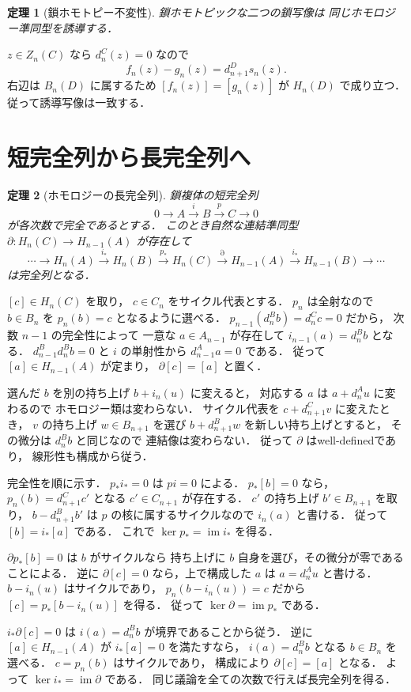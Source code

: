 \documentclass[a5paper,10pt,onecolumn]{jsarticle}
\makeatletter
\theoremstyle{mathnotetheorem}
\newtheorem{theorem}{定理}[section]
\renewcommand{\proofname}{証明}
\renewenvironment{proof}[1][\proofname]{%
  \par\pushQED{\qed}\normalfont\topsep4\p@\@plus2\p@\relax
  \trivlist\item[\hskip\labelsep\bfseries #1]\ignorespaces
}{\popQED\endtrivlist\@endpefalse}
\makeatother
\begin{document}
\begin{theorem}[鎖ホモトピー不変性]\label{thm:chain-homotopy}
鎖ホモトピックな二つの鎖写像は
同じホモロジー準同型を誘導する．
\end{theorem}
\begin{proof}
$z\in Z_n(C)$ なら $d^C_n(z)=0$ なので
\[
 f_n(z)-g_n(z)=d^D_{n+1}s_n(z).
\]
右辺は $B_n(D)$ に属するため
$[f_n(z)]=[g_n(z)]$ が $H_n(D)$ で成り立つ．
従って誘導写像は一致する．
\end{proof}

\section{短完全列から長完全列へ}

\begin{theorem}[ホモロジーの長完全列]
\label{thm:long-exact}
鎖複体の短完全列
\[
 0\longrightarrow A
 \xrightarrow{i}B\xrightarrow{p}C\longrightarrow0
\]
が各次数で完全であるとする．
このとき自然な連結準同型
$\partial:H_n(C)\to H_{n-1}(A)$ が存在して
\[
 \cdots\to H_n(A)\xrightarrow{i_*}H_n(B)
 \xrightarrow{p_*}H_n(C)\xrightarrow{\partial}H_{n-1}(A)
 \xrightarrow{i_*}H_{n-1}(B)\to\cdots
\]
は完全列となる．
\end{theorem}
\begin{proof}
$[c]\in H_n(C)$ を取り，
$c\in C_n$ をサイクル代表とする．
$p_n$ は全射なので $b\in B_n$ を
$p_n(b)=c$ となるように選べる．
$p_{n-1}(d^B_nb)=d^C_nc=0$ だから，
次数 $n-1$ の完全性によって
一意な $a\in A_{n-1}$ が存在して
$i_{n-1}(a)=d^B_nb$ となる．
$d^B_{n-1}d^B_nb=0$ と $i$ の単射性から
$d^A_{n-1}a=0$ である．
従って $[a]\in H_{n-1}(A)$ が定まり，
$\partial[c]=[a]$ と置く．

選んだ $b$ を別の持ち上げ $b+i_n(u)$ に変えると，
対応する $a$ は $a+d^A_nu$ に変わるので
ホモロジー類は変わらない．
サイクル代表を $c+d^C_{n+1}v$ に変えたとき，
$v$ の持ち上げ $w\in B_{n+1}$ を選び
$b+d^B_{n+1}w$ を新しい持ち上げとすると，
その微分は $d^B_nb$ と同じなので
連結像は変わらない．
従って $\partial$ はwell-definedであり，
線形性も構成から従う．

完全性を順に示す．
$p_*i_*=0$ は $pi=0$ による．
$p_*[b]=0$ なら，
$p_n(b)=d^C_{n+1}c'$ となる $c'\in C_{n+1}$ が存在する．
$c'$ の持ち上げ $b'\in B_{n+1}$ を取り，
$b-d^B_{n+1}b'$ は $p$ の核に属するサイクルなので
$i_n(a)$ と書ける．
従って $[b]=i_*[a]$ である．
これで $\ker p_*=\operatorname{im}i_*$ を得る．

$\partial p_*[b]=0$ は $b$ がサイクルなら
持ち上げに $b$ 自身を選び，その微分が零であることによる．
逆に $\partial[c]=0$ なら，上で構成した $a$ は
$a=d^A_nu$ と書ける．
$b-i_n(u)$ はサイクルであり，
$p_n(b-i_n(u))=c$ だから
$[c]=p_*[b-i_n(u)]$ を得る．
従って $\ker\partial=\operatorname{im}p_*$ である．

$i_*\partial[c]=0$ は
$i(a)=d^B_nb$ が境界であることから従う．
逆に $[a]\in H_{n-1}(A)$ が $i_*[a]=0$ を満たすなら，
$i(a)=d^B_nb$ となる $b\in B_n$ を選べる．
$c=p_n(b)$ はサイクルであり，
構成により $\partial[c]=[a]$ となる．
よって $\ker i_*=\operatorname{im}\partial$ である．
同じ議論を全ての次数で行えば長完全列を得る．
\end{proof}
\end{document}
